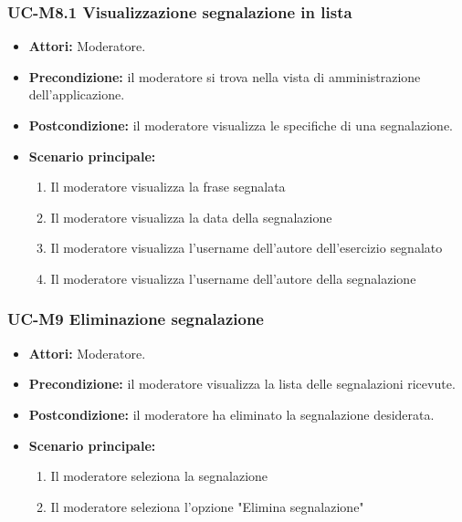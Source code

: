 \subsubsection{UC-M8.1 Visualizzazione segnalazione in lista}
\begin{itemize}
	\item \textbf{Attori:} Moderatore.
	\item \textbf{Precondizione:} il moderatore si trova nella vista di amministrazione dell'applicazione.
	\item \textbf{Postcondizione:} il moderatore visualizza le specifiche di una segnalazione.
	\item \textbf{Scenario principale:}
	\begin{enumerate}
		\item Il moderatore visualizza la frase segnalata
		\item Il moderatore visualizza la data della segnalazione
		\item Il moderatore visualizza l'username dell'autore dell'esercizio segnalato
		\item Il moderatore visualizza l'username dell'autore della segnalazione
	\end{enumerate}
\end{itemize}

\subsubsection{UC-M9 Eliminazione segnalazione}
\begin{itemize}
	\item \textbf{Attori:} Moderatore.
	\item \textbf{Precondizione:} il moderatore visualizza la lista delle segnalazioni ricevute.
	\item \textbf{Postcondizione:} il moderatore ha eliminato la segnalazione desiderata.
	\item \textbf{Scenario principale:}
	\begin{enumerate}
		\item Il moderatore seleziona la segnalazione
		\item Il moderatore seleziona l'opzione "Elimina segnalazione"
	\end{enumerate}
\end{itemize}


